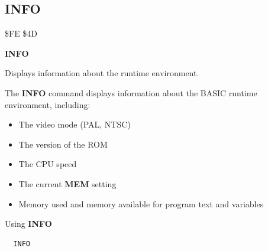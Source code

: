 \subsection{INFO}
\begin{description}[leftmargin=2cm,style=nextline]
\item [Token:] \$FE \$4D
\item [Format:] {\bf INFO}
\item [Usage:]
   Displays information about the runtime environment.

\item [Remarks:]
   The {\bf INFO} command displays information about the BASIC runtime
   environment, including:
   \begin{itemize}
      \item The video mode (PAL, NTSC)
      \item The version of the ROM
      \item The CPU speed
      \item The current {\bf MEM} setting
      \item Memory used and memory available for program text and variables
   \end{itemize}

\item [Examples:] Using {\bf INFO}
\begin{tcolorbox}[colback=black,coltext=white]
\verbatimfont{\codefont}
\begin{verbatim}
  INFO
\end{verbatim}
\end{tcolorbox}
\end{description}



\newpage
